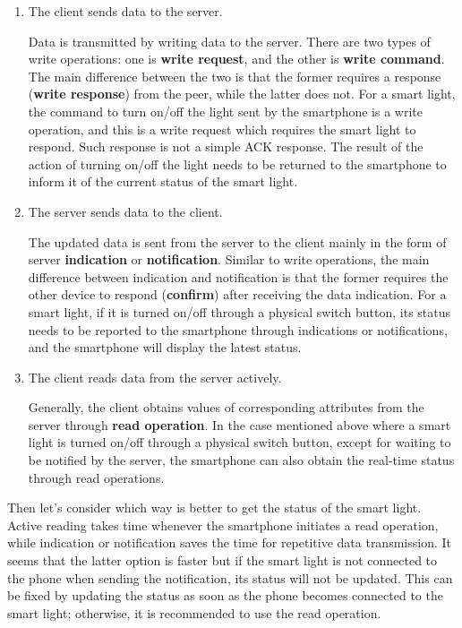 \documentclass[a4paper,12pt,openany]{book}
\begin{document}
\begin{enumerate}[label=(\arabic*)]
    \item The client sends data to the server.
    
    Data is transmitted by writing data to the server. There are two types of write operations: one is \textbf{write request}, and the other is \textbf{write command}. The main difference between the two is that the former requires a response (\textbf{write response}) from the peer, while the latter does not. For a smart light, the command to turn on/off the light sent by the smartphone is a write operation, and this is a write request which requires the smart light to respond. Such response is not a simple ACK response. The result of the action of turning on/off the light needs to be returned to the smartphone to inform it of the current status of the smart light.
    \item The server sends data to the client.
    
    The updated data is sent from the server to the client mainly in the form of server \textbf{indication} or \textbf{notification}. Similar to write operations, the main difference between indication and notification is that the former requires the other device to respond (\textbf{confirm}) after receiving the data indication. For a smart light, if it is turned on/off through a physical switch button, its status needs to be reported to the smartphone through indications or notifications, and the smartphone will display the latest status.
    \item The client reads data from the server actively.
    
    Generally, the client obtains values of corresponding attributes from the server through \textbf{read operation}. In the case mentioned above where a smart light is turned on/off through a physical switch button, except for waiting to be notified by the server, the smartphone can also obtain the real-time status through read operations.
\end{enumerate}

Then let’s consider which way is better to get the status of the smart light. Active reading takes time whenever the smartphone initiates a read operation, while indication or notification saves the time for repetitive data transmission. It seems that the latter option is faster but if the smart light is not connected to the phone when sending the notification, its status will not be updated. This can be fixed by updating the status as soon as the phone becomes connected to the smart light; otherwise, it is recommended to use the read operation.
\end{document}
